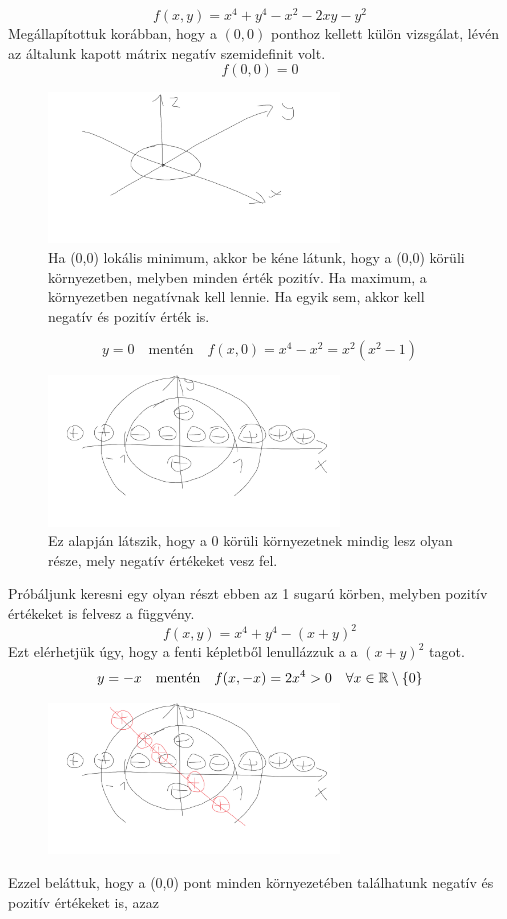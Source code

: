 \documentclass[a4paper,11.5pt]{article}
\begin{document}
	\begin{task}
		\[ f(x,y)=x^4+y^4-x^2-2xy-y^2 \]
		Megállapítottuk korábban, hogy a $(0,0)$ ponthoz kellett külön vizsgálat, lévén az általunk kapott mátrix negatív szemidefinit volt.
		\[ f(0,0)=0 \]
		
		\begin{figure}[H]
			\centering
			\includegraphics[height=4cm]{../2zh/kepek/41.png}
			\caption{Ha (0,0) lokális minimum, akkor be kéne látunk, hogy a (0,0) körüli környezetben, melyben minden érték pozitív. Ha maximum, a környezetben negatívnak kell lennie. Ha egyik sem, akkor kell negatív és pozitív érték is.}
		\end{figure}
		\[  y=0\quad \text{mentén}\quad f(x,0)=x^4-x^2=x^2(x^2-1) \]
		\begin{figure}[H]
			\centering
			\includegraphics[height=4cm]{../2zh/kepek/42.png}
			\caption{Ez alapján látszik, hogy a 0 körüli környezetnek mindig lesz olyan része, mely negatív értékeket vesz fel.}
		\end{figure}
		Próbáljunk keresni egy olyan részt ebben az 1 sugarú körben, melyben pozitív értékeket is felvesz a függvény.
		\[ f(x,y)=x^4+y^4-(x+y)^2 \]
		Ezt elérhetjük úgy, hogy a fenti képletből lenullázzuk a a $(x+y)^2$ tagot.
		\[ y=-x\quad \text{mentén}\quad f(x,-x)=2x^4>0\quad \forall x\in\mathbb{R}\setminus\{0\} \]
		\begin{figure}[H]
			\centering
			\includegraphics[height=4cm]{../2zh/kepek/43.png}
			\caption{}
		\end{figure}
		Ezzel beláttuk, hogy a (0,0) pont minden környezetében találhatunk negatív és pozitív értékeket is, azaz
		

\end{task}
\end{document}

